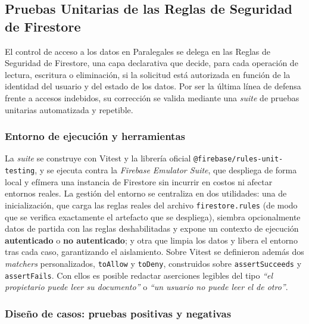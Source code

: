 \subsection{Pruebas Unitarias de las Reglas de Seguridad de Firestore}\label{subsec:pruebas-reglas-firestore}

El control de acceso a los datos en Paralegales se delega en las Reglas de Seguridad de Firestore, una capa declarativa que decide, para cada operación de lectura, escritura o eliminación, si la solicitud está autorizada en función de la identidad del usuario y del estado de los datos. Por ser la última línea de defensa frente a accesos indebidos, su corrección se valida mediante una \textit{suite} de pruebas unitarias automatizada y repetible.

\subsubsection{Entorno de ejecución y herramientas}

La \textit{suite} se construye con Vitest y la librería oficial \texttt{@firebase/rules-unit-testing}, y se ejecuta contra la \textit{Firebase Emulator Suite}, que despliega de forma local y efímera una instancia de Firestore sin incurrir en costos ni afectar entornos reales. La gestión del entorno se centraliza en dos utilidades: una de inicialización, que carga las reglas reales del archivo \texttt{firestore.rules} (de modo que se verifica exactamente el artefacto que se despliega), siembra opcionalmente datos de partida con las reglas deshabilitadas y expone un contexto de ejecución \textbf{autenticado} o \textbf{no autenticado}; y otra que limpia los datos y libera el entorno tras cada caso, garantizando el aislamiento. Sobre Vitest se definieron además dos \textit{matchers} personalizados, \texttt{toAllow} y \texttt{toDeny}, construidos sobre \texttt{assertSucceeds} y \texttt{assertFails}. Con ellos es posible redactar aserciones legibles del tipo \textit{``el propietario puede leer su documento''} o \textit{``un usuario no puede leer el de otro''}.

\subsubsection{Diseño de casos: pruebas positivas y negativas}

